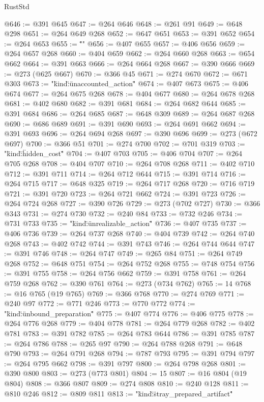 \begin{lexlean}{RustStd}
\begin{coremodule}
{\begin{coremodule}
{{{{{{{{{{{{{{{{{{{{{{{{{{{{{{{{{{{{{{{{{{{{{{{{{{{{{{{{{{{{{{{{{{{{{{{{{{{{@646 := @391 @645
@647 := @264 @646
@648 := @261 @91
@649 := @648 @298
@651 := @264 @649 @268
@652 := @647 @651
@653 := @391 @652
@654 := @264 @653
@655 := "\"}"
@656 := @407 @655
@657 := @406 @656
@659 := @264 @657 @268
@660 := @404 @659
@662 := @264 @660 @268
@663 := @654 @662
@664 := @391 @663
@666 := @264 @664 @268
@667 := @390 @666
@669 := @273 (@625 @667)
@670 := @366 @45
@671 := @274 @670
@672 := @671 @303
@673 := "{\"kind\":\"unaccounted_action\""
@674 := @407 @673
@675 := @406 @674
@677 := @264 @675 @268
@678 := @404 @677
@680 := @264 @678 @268
@681 := @402 @680
@682 := @391 @681
@684 := @264 @682 @644
@685 := @391 @684
@686 := @264 @685
@687 := @648 @309
@689 := @264 @687 @268
@690 := @686 @689
@691 := @391 @690
@693 := @264 @691 @662
@694 := @391 @693
@696 := @264 @694 @268
@697 := @390 @696
@699 := @273 (@672 @697)
@700 := @366 @51
@701 := @274 @700
@702 := @701 @319
@703 := "{\"kind\":\"hidden_cost\""
@704 := @407 @703
@705 := @406 @704
@707 := @264 @705 @268
@708 := @404 @707
@710 := @264 @708 @268
@711 := @402 @710
@712 := @391 @711
@714 := @264 @712 @644
@715 := @391 @714
@716 := @264 @715
@717 := @648 @325
@719 := @264 @717 @268
@720 := @716 @719
@721 := @391 @720
@723 := @264 @721 @662
@724 := @391 @723
@726 := @264 @724 @268
@727 := @390 @726
@729 := @273 (@702 @727)
@730 := @366 @343
@731 := @274 @730
@732 := @240 @84
@733 := @732 @246
@734 := @731 @733
@735 := "{\"kind\":\"unrealizable_action\""
@736 := @407 @735
@737 := @406 @736
@739 := @264 @737 @268
@740 := @404 @739
@742 := @264 @740 @268
@743 := @402 @742
@744 := @391 @743
@746 := @264 @744 @644
@747 := @391 @746
@748 := @264 @747
@749 := @265 @84
@751 := @264 @749 @268
@752 := @648 @751
@754 := @264 @752 @268
@755 := @748 @754
@756 := @391 @755
@758 := @264 @756 @662
@759 := @391 @758
@761 := @264 @759 @268
@762 := @390 @761
@764 := @273 (@734 @762)
@765 := 14
@768 := @16 @765 (@19 @765)
@769 := @366 @768
@770 := @274 @769
@771 := @240 @97
@772 := @771 @246
@773 := @770 @772
@774 := "{\"kind\":\"unbound_preparation\""
@775 := @407 @774
@776 := @406 @775
@778 := @264 @776 @268
@779 := @404 @778
@781 := @264 @779 @268
@782 := @402 @781
@783 := @391 @782
@785 := @264 @783 @644
@786 := @391 @785
@787 := @264 @786
@788 := @265 @97
@790 := @264 @788 @268
@791 := @648 @790
@793 := @264 @791 @268
@794 := @787 @793
@795 := @391 @794
@797 := @264 @795 @662
@798 := @391 @797
@800 := @264 @798 @268
@801 := @390 @800
@803 := @273 (@773 @801)
@804 := 15
@807 := @16 @804 (@19 @804)
@808 := @366 @807
@809 := @274 @808
@810 := @240 @128
@811 := @810 @246
@812 := @809 @811
@813 := "{\"kind\":\"stray_prepared_artifact\""
}}}}}}}}}}}}}}}}}}}}}}}}}}}}}}}}}}}}}}}}}}}}}}}}}}}}}}}}}}}}}}}}}}}}}}}}}}}}}}}}
\end{coremodule}}
\end{coremodule}
\end{lexlean}
